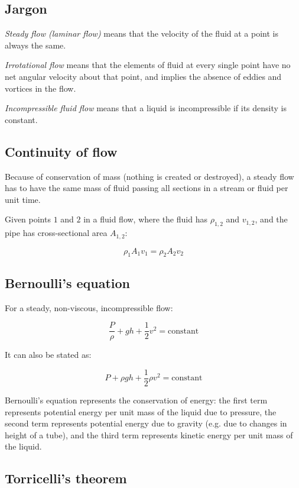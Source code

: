 \documentclass[12pt]{article}
\begin{document}
\subsection{Jargon}

\emph{Steady flow (laminar flow)} means that the velocity of the fluid at a point is always the same.

\emph{Irrotational flow} means that the elements of fluid at every single point have no net angular velocity about that point, and implies the absence of eddies and vortices in the flow.

\emph{Incompressible fluid flow} means that a liquid is incompressible if its density is constant.

\subsection{Continuity of flow}

Because of conservation of mass (nothing is created or destroyed), a steady flow has to have the same mass of fluid passing all sections in a stream or fluid per unit time.

Given points $1$ and $2$ in a fluid flow, where the fluid has $\rho_{1,2}$ and $v_{1,2}$, and the pipe has cross-sectional area $A_{1,2}$:

\[
\boxed{
\rho_1 A_1 v_1 = \rho_2 A_2 v_2
}
\]

\subsection{Bernoulli's equation}

For a steady, non-viscous, incompressible flow:

\[
\boxed{
\frac{P}{\rho} + gh + \frac{1}{2}v^2 = \text{constant}
}
\]

It can also be stated as:

\[
\boxed{
P + \rho g h + \frac{1}{2}\rho v^2 = \text{constant}
}
\]

Bernoulli's equation represents the conservation of energy: the first term represents potential energy per unit mass of the liquid due to pressure, the second term represents potential energy due to gravity (e.g. due to changes in height of a tube), and the third term represents kinetic energy per unit mass of the liquid.

\subsection{Torricelli's theorem}
\end{document}

